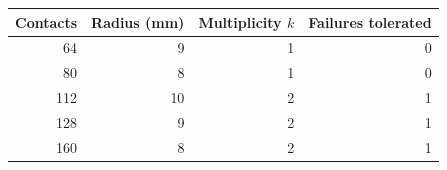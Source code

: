 \begin{tabular}{rrrr}
\toprule
Contacts & Radius (mm) & Multiplicity $k$ & Failures tolerated \\
\midrule
64 & 9 & 1 & 0 \\
80 & 8 & 1 & 0 \\
112 & 10 & 2 & 1 \\
128 & 9 & 2 & 1 \\
160 & 8 & 2 & 1 \\
\bottomrule
\end{tabular}
